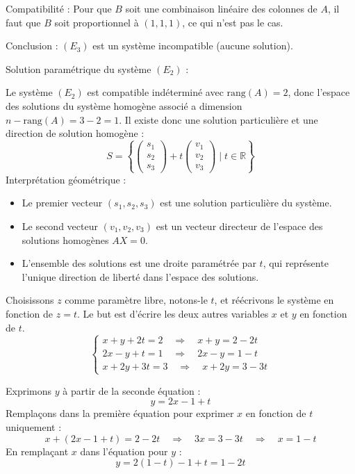 \documentclass[10pt,a4paper]{article}
\begin{document}
Compatibilité : Pour que $B$ soit une combinaison linéaire des colonnes de $A$, il faut que $B$ soit
proportionnel à $(1,1,1)$, ce qui n'est pas le cas.

Conclusion : \( (E_3) \) est un système incompatible (aucune solution).


\q Solution paramétrique du système \((E_2)\) :

Le système \((E_2)\) est compatible indéterminé avec \( \text{rang}(A) = 2 \), donc l'espace des
solutions du système homogène associé a dimension \( n - \text{rang}(A) = 3 - 2 = 1 \). Il existe
donc une solution particulière et une direction de solution homogène :
\[
S = \left\{ \begin{pmatrix} s_1 \\ s_2 \\ s_3 \end{pmatrix} + t \begin{pmatrix} v_1 \\ v_2 \\ v_3
\end{pmatrix} \mid t \in \mathbb{R} \right\}
\]
Interprétation géométrique :
\begin{itemize}
    \item Le premier vecteur \( (s_1, s_2, s_3) \) est une solution particulière du système.
    \item Le second vecteur \( (v_1, v_2, v_3) \) est un vecteur directeur de l'espace des solutions
    homogènes \( AX = 0 \).
    \item L'ensemble des solutions est une droite paramétrée par \( t \), qui représente l'unique
    direction de liberté dans l'espace des solutions.
\end{itemize}

Choisissons \( z \) comme paramètre libre, notons-le \( t \), et réécrivons le système en fonction
de \( z = t \). Le but est d'écrire les deux autres variables $x$ et $y$ en fonction de $t$.
\[
\begin{cases}
x + y + 2t = 2 \quad \Rightarrow \quad x + y = 2 - 2t \\
2x - y + t = 1 \quad \Rightarrow \quad 2x - y = 1 - t \\
x + 2y + 3t = 3 \quad \Rightarrow \quad x + 2y = 3 - 3t
\end{cases}
\]

Exprimons \( y \) à partir de la seconde équation :
\[
y = 2x - 1 + t
\]
Remplaçons dans la première équation pour exprimer \( x \) en fonction de \( t \) uniquement :
\[
x + (2x - 1 + t) = 2 - 2t \quad \Rightarrow \quad 3x = 3 - 3t \quad \Rightarrow \quad x = 1 - t
\]
En remplaçant $x$ dans l'équation pour $y$ :
\[
y = 2(1 - t) - 1 + t = 1 - 2t
\]
\end{document}
